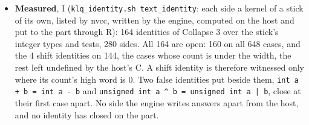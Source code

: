 \begin{itemize}
\item \textbf{Measured}, I (\texttt{klq\_\allowbreak{}identity.\allowbreak{}sh text\_\allowbreak{}identity}: each side a kernel of a stick of its own, listed by nvcc, written by the engine, computed on the host and put to the part through R): 164 identities of Collapse 3 over the stick's integer types and tests, 280 sides. All 164 are open: 160 on all 648 cases, and the 4 shift identities on 144, the cases whose count is under the width, the rest left undefined by the host's C. A shift identity is therefore witnessed only where its count's high word is 0. Two false identities put beside them, \texttt{int a + b = int a -\allowbreak{} b} and \texttt{unsigned int a \textasciicircum{} b = unsigned int a | b}, close at their first case apart. No side the engine writes answers apart from the host, and no identity has closed on the part.

\end{itemize}
